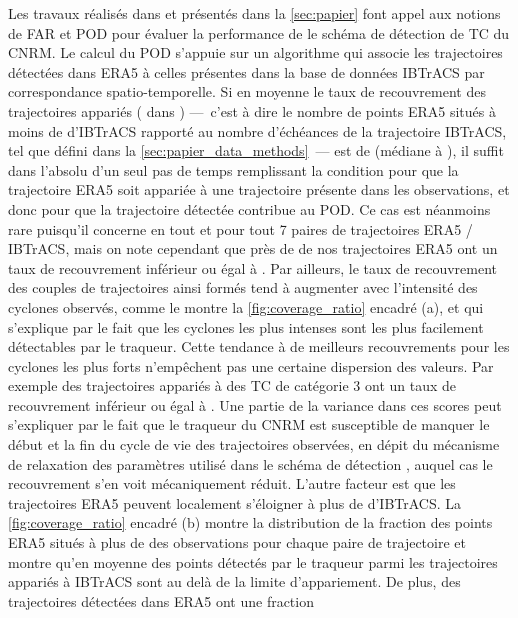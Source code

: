 \documentclass[../main.tex]{subfiles}
\begin{document}
Les travaux réalisés dans \cite{dulac_assessing_2023} et présentés dans la \cref{sec:papier} font appel aux notions de FAR et POD pour évaluer la performance de
le schéma de détection de TC du CNRM. Le calcul du POD s'appuie sur un algorithme qui associe les trajectoires détectées dans ERA5 à celles présentes dans la
base de données IBTrACS par correspondance spatio-temporelle. Si en moyenne le taux de recouvrement des trajectoires appariés ( dans
\cite{dulac_assessing_2023}) ---~c'est à dire le nombre de points ERA5 situés à moins de  d'IBTrACS rapporté au nombre d'échéances de la trajectoire
IBTrACS, tel que défini dans la \cref{sec:papier_data_methods}~--- est de  (médiane à ), il suffit dans l'absolu d'un seul pas de temps
remplissant la condition pour que la trajectoire ERA5 soit appariée à une trajectoire présente dans les observations, et donc pour que la trajectoire détectée
contribue au POD. Ce cas est néanmoins rare puisqu'il concerne en tout et pour tout \num{7} paires de trajectoires ERA5 / IBTrACS, mais on note cependant que
près de  de nos trajectoires ERA5 ont un taux de recouvrement inférieur ou égal à . Par ailleurs, le taux de recouvrement des couples de
trajectoires ainsi formés tend à augmenter avec l'intensité des cyclones observés, comme le montre la \cref{fig:coverage_ratio} encadré (a), et qui s'explique
par le fait que les cyclones les plus intenses sont les plus facilement détectables par le traqueur. Cette tendance à de meilleurs recouvrements pour les
cyclones les plus forts n'empêchent pas une certaine dispersion des valeurs. Par exemple  des trajectoires appariés à des TC de catégorie \num{3} ont un
taux de recouvrement inférieur ou égal à . Une partie de la variance dans ces scores peut s'expliquer par le fait que le traqueur du CNRM est
susceptible de manquer le début et la fin du cycle de vie des trajectoires observées, en dépit du mécanisme de relaxation des paramètres utilisé dans le schéma
de détection \parencite[][Figure 8]{bourdin_intercomparison_2022}, auquel cas le recouvrement s'en voit mécaniquement réduit. L'autre facteur est que les
trajectoires ERA5 peuvent localement s'éloigner à plus de  d'IBTrACS. La \cref{fig:coverage_ratio} encadré (b) montre la distribution de la fraction des
points ERA5 situés à plus de  des observations pour chaque paire de trajectoire et montre qu'en moyenne  des points détectés par le traqueur
parmi les trajectoires appariés à IBTrACS sont au delà de la limite d'appariement. De plus,  des trajectoires détectées dans ERA5 ont une fraction
\end{document}

